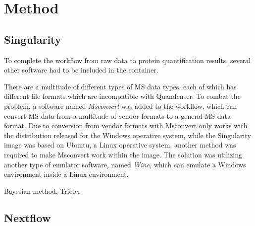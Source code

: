 \section{Method}


\subsection{Singularity}
To complete the workflow from raw data to protein quantification results, several other software had to be included in the container.

There are a multitude of different types of MS data types, each of which has different file formats which are incompatible with Quandenser. To combat the problem, a software named \textit{Msconvert} was added to the workflow, which can convert MS data from a multitude of vendor formats to a general MS data format. Due to conversion from vendor formats with Msconvert only works with the distribution released for the Windows operative system, while the Singularity image was based on Ubuntu, a Linux operative system, another method was required to make Msconvert work within the image. The solution was utilizing another type of emulator software, named \textit{Wine}, which can emulate a Windows environment inside a Linux environment.

Bayesian method, Triqler

\subsection{Nextflow}

